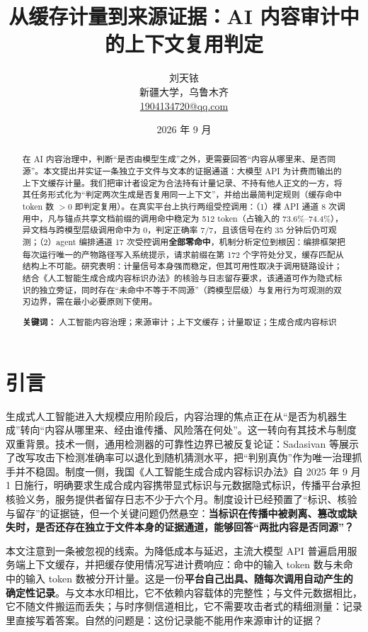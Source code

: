 \documentclass[11pt, a4paper]{ctexart}
\title{从缓存计量到来源证据：AI 内容审计中的上下文复用判定}
\author{刘天铱\\
{\small 新疆大学，乌鲁木齐}\\
{\small \href{mailto:1904134720@qq.com}{1904134720@qq.com}}}
\date{2026 年 9 月}
\begin{document}
\sloppy
\maketitle

\begin{abstract}
在 AI 内容治理中，判断“是否由模型生成”之外，更需要回答“内容从哪里来、是否同源”。本文提出并实证一条独立于文件与文本的证据通道：大模型 API 为计费而输出的上下文缓存计量。我们把审计者设定为合法持有计量记录、不持有他人正文的一方，将其任务形式化为“判定两次生成是否复用同一上下文”，并给出最简判定规则（缓存命中 token 数 $> 0$ 即判定复用）。在真实平台上执行两组受控调用：（1）裸 API 通道 8 次调用中，凡与锚点共享文档前缀的调用命中稳定为 512 token（占输入的 73.6\%--74.4\%），异文档与跨模型层级调用命中为 0，判定正确率 7/7，且该信号在约 35 分钟后仍可观测；（2）agent 编排通道 17 次受控调用\textbf{全部零命中}，机制分析定位到根因：编排框架把每次运行唯一的产物路径写入系统提示，请求前缀在第 172 个字符处分叉，缓存匹配从结构上不可能。研究表明：计量信号本身强而稳定，但其可用性取决于调用链路设计；结合《人工智能生成合成内容标识办法》的核验与日志留存要求，该通道可作为隐式标识的独立旁证，同时存在“未命中不等于不同源”（跨模型层级）与复用行为可观测的双刃边界，需在最小必要原则下使用。

\noindent\textbf{关键词：} 人工智能内容治理；来源审计；上下文缓存；计量取证；生成合成内容标识
\end{abstract}

\section{引言}

生成式人工智能进入大规模应用阶段后，内容治理的焦点正在从“是否为机器生成”转向“内容从哪里来、经由谁传播、风险落在何处”。这一转向有其技术与制度双重背景。技术一侧，通用检测器的可靠性边界已被反复论证：Sadasivan 等展示了改写攻击下检测准确率可以退化到随机猜测水平\cite{sadasivan2025tmlr}，把“判别真伪”作为唯一治理抓手并不稳固。制度一侧，我国《人工智能生成合成内容标识办法》自 2025 年 9 月 1 日施行，明确要求生成合成内容携带显式标识与元数据隐式标识，传播平台承担核验义务，服务提供者留存日志不少于六个月\cite{cac2025labeling}。制度设计已经预置了“标识、核验与留存”的证据链，但一个关键问题仍然悬空：\textbf{当标识在传播中被剥离、篡改或缺失时，是否还存在独立于文件本身的证据通道，能够回答“两批内容是否同源”？}

本文注意到一条被忽视的线索。为降低成本与延迟，主流大模型 API 普遍启用服务端上下文缓存，并把缓存使用情况写进计费响应：命中的输入 token 数与未命中的输入 token 数被分开计量\cite{deepseekcache}。这是一份\textbf{平台自己出具、随每次调用自动产生的确定性记录}。与文本水印相比，它不依赖内容载体的完整性；与文件元数据相比，它不随文件搬运而丢失；与时序侧信道相比\cite{song2025earlybird,wu2025iknow}，它不需要攻击者式的精细测量：记录里直接写着答案。自然的问题是：这份记录能不能用作来源审计的证据？
\end{document}

